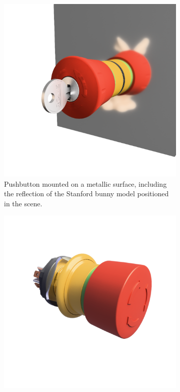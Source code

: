 \begin{figure}[H]
    \centering
    \hspace*{1cm}
    \begin{subfigure}[t]{0.38\textwidth}
        \includegraphics[width=\textwidth]{resources/demo-reflection.png}
        \caption{Pushbutton mounted on a metallic surface, including the reflection of the Stanford bunny model \cite{turkLevoy1994} positioned in the scene.}
        \label{fig:demo-reflection}
    \end{subfigure}
    \hfill
    \begin{subfigure}[t]{0.38\textwidth}
        \includegraphics[width=\textwidth]{resources/demo-specular.png}

\end{subfigure}
\end{figure}
